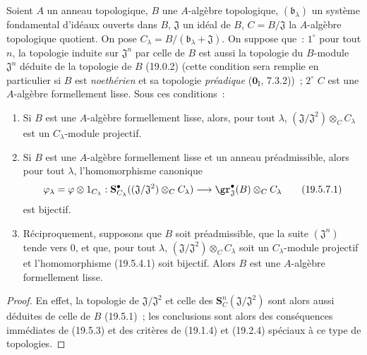\begin{corollary}[19.5.7]
\label{0.19.5.7-fr}
Soient $A$ un anneau topologique, $B$ une $A$-algèbre topologique,
$(\mathfrak b_\lambda)$ un système fondamental d'idéaux ouverts dans $B$,
$\mathfrak J$ un idéal de $B$, $C=B/\mathfrak J$ la $A$-algèbre topologique
quotient. On pose $C_\lambda=B/(\mathfrak b_\lambda+\mathfrak J)$. On suppose
que~: $1^\circ$ pour tout $n$, la topologie induite sur $\mathfrak J^n$ par
celle de $B$ est aussi la topologie du $B$-module $\mathfrak J^n$ déduite de
la topologie de $B$ \textup{(19.0.2) (cette condition sera remplie en particulier si
$B$ est \emph{noethérien} et sa topologie \emph{préadique} ($\mathbf 0_{\mathrm I}$,
7.3.2))}~; $2^\circ$ $C$ est une $A$-algèbre formellement lisse. Sous ces
conditions~:
\begin{enumerate}
  \item[\rm(i)] Si $B$ est une $A$-algèbre formellement lisse, alors, pour tout
  $\lambda$, $(\mathfrak J/\mathfrak J^2)\otimes_C C_\lambda$ est un
  $C_\lambda$-module projectif.
  \item[\rm(ii)] Si $B$ est une $A$-algèbre formellement lisse et un anneau
  préadmissible, alors pour tout $\lambda$, l'homomorphisme canonique
  \begin{equation}
  \label{0.19.5.7.1-fr}
    \varphi_\lambda=\varphi\otimes 1_{C_\lambda}:
    \mathbf S_{C_\lambda}^\bullet((\mathfrak J/\mathfrak J^2)\otimes_C C_\lambda)
    \longrightarrow\gr_{\mathfrak J}^\bullet(B)\otimes_C C_\lambda
    \tag{19.5.7.1}
  \end{equation}
  est bijectif.


  \item[\rm(iii)] Réciproquement, supposons que $B$ soit préadmissible, que la
  suite $(\mathfrak J^n)$ tende vers $0$, et que, pour tout $\lambda$,
  $(\mathfrak J/\mathfrak J^2)\otimes_C C_\lambda$ soit un $C_\lambda$-module
  projectif et l'homomorphisme \textup{(19.5.4.1)} soit bijectif. Alors $B$ est une
  $A$-algèbre formellement lisse.
\end{enumerate}
\end{corollary}

\begin{proof}
En effet, la topologie de $\mathfrak J/\mathfrak J^2$ et celle des
$\mathbf S_C^n(\mathfrak J/\mathfrak J^2)$ sont alors aussi déduites de celle
de $B$ (19.5.1)~; les conclusions sont alors des conséquences immédiates de
(19.5.3) et des critères de (19.1.4) et (19.2.4) spéciaux à ce type de
topologies.
\end{proof}

